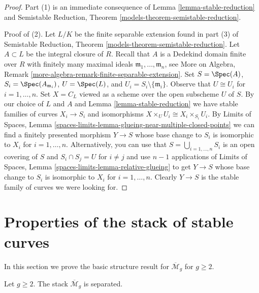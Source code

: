 \begin{proof}
Part (1) is an immediate consequence of Lemma \ref{lemma-stable-reduction} and
Semistable Reduction, Theorem \ref{models-theorem-semistable-reduction}.

\medskip\noindent
Proof of (2). Let $L/K$ be the finite separable extension found in part (3) of
Semistable Reduction, Theorem \ref{models-theorem-semistable-reduction}.
Let $A \subset L$ be the integral closure of $R$.
Recall that $A$ is a Dedekind domain finite over $R$ with
finitely many maximal ideals $\mathfrak m_1, \ldots, \mathfrak m_n$, see
More on Algebra, Remark \ref{more-algebra-remark-finite-separable-extension}.
Set $S = \Spec(A)$, $S_i = \Spec(A_{\mathfrak m_i})$,
$U = \Spec(L)$, and $U_i = S_i \setminus \{\mathfrak m_i\}$.
Observe that $U \cong U_i$ for $i = 1, \ldots, n$.
Set $X = C_L$ viewed as a scheme over the open subscheme $U$ of $S$.
By our choice of $L$ and $A$ and Lemma \ref{lemma-stable-reduction}
we have stable families of curves $X_i \to S_i$ and isomorphisms
$X \times_U U_i \cong X_i \times_{S_i} U_i$.
By Limits of Spaces, Lemma
\ref{spaces-limits-lemma-glueing-near-multiple-closed-points}
we can find a finitely presented morphism $Y \to S$
whose base change to $S_i$ is isomorphic to $X_i$ for $i = 1, \ldots, n$.
Alternatively, you can use that $S = \bigcup_{i = 1, \ldots, n} S_i$
is an open covering of $S$ and $S_i \cap S_j = U$ for $i \not = j$
and use $n - 1$ applications of
Limits of Spaces, Lemma \ref{spaces-limits-lemma-relative-glueing}
to get $Y \to S$ whose
base change to $S_i$ is isomorphic to $X_i$ for $i = 1, \ldots, n$.
Clearly $Y \to S$ is the stable family of curves we were looking for.
\end{proof}






\section{Properties of the stack of stable curves}
\label{section-properties-stable}

\noindent
In this section we prove the basic structure result for
$\overline{\mathcal{M}}_g$ for $g \geq 2$.

\begin{lemma}
\label{lemma-stable-separated}
Let $g \geq 2$. The stack $\overline{\mathcal{M}}_g$ is separated.
\end{lemma}

